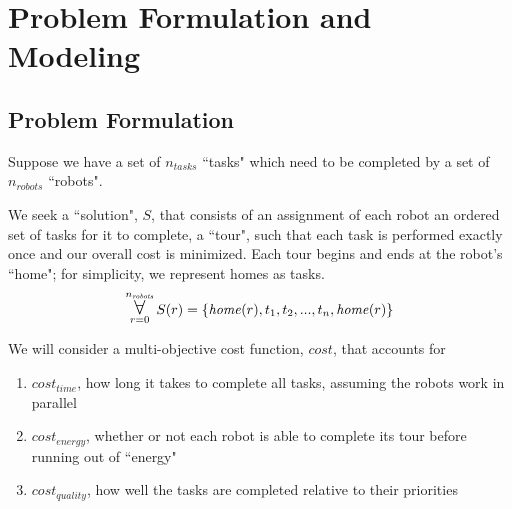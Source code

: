 \documentclass[a4paper]{article}
\newcommand\Forall{\mathop{\mbox{\Large $\mathsurround0pt\forall$}}}
\begin{document}
\section{Problem Formulation and Modeling}


%
%


\subsection{Problem Formulation}


Suppose we have a set of $n_\mathit{tasks}$ ``tasks" which need to be completed by a set of $n_\mathit{robots}$ ``robots".

We seek a ``solution", $S$, that consists of an assignment of each robot an ordered set of tasks for it to complete, a ``tour", such that each task is performed exactly once and our overall cost is minimized. Each tour begins and ends at the robot's ``home"; for simplicity, we represent homes as tasks.
$$
\Forall_{r=0}^{n_\mathit{robots}}
S(r) = \{ \mathit{home}(r), t_1, t_2, ..., t_n, \mathit{home}(r) \}
$$

We will consider a multi-objective cost function, $\mathit{cost}$, that accounts for
\begin{enumerate}
\item $\mathit{cost}_\mathit{time}$, how long it takes to complete all tasks, assuming the robots work in parallel
\item $\mathit{cost}_\mathit{energy}$, whether or not each robot is able to complete its tour before running out of ``energy"
\item $\mathit{cost}_\mathit{quality}$, how well the tasks are completed relative to their priorities
\end{enumerate}
\end{document}
